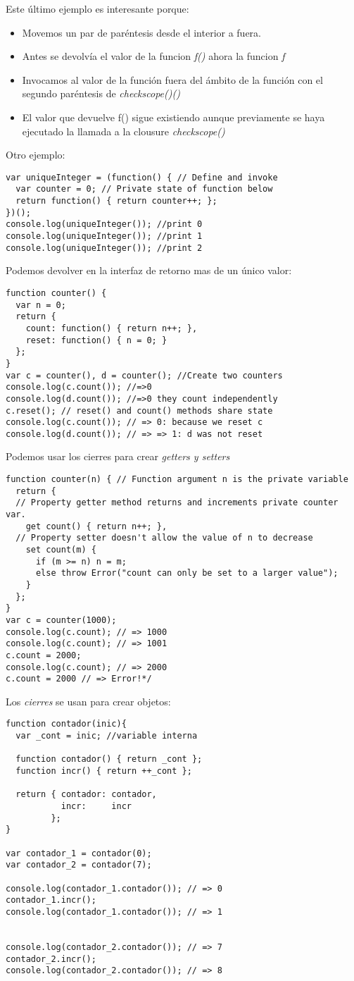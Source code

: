\documentclass[4paper]{article}
\begin{document}
Este último ejemplo es interesante porque:
\begin{itemize}
\item Movemos un par de paréntesis desde el interior a fuera.
\item Antes se devolvía el valor de la funcion \textit{f()} ahora la funcion \textit{f}
\item Invocamos al valor de la función fuera del ámbito de la función con el segundo paréntesis de \emph{checkscope()()}
\item El valor que devuelve f() sigue existiendo aunque previamente se haya ejecutado la llamada a la clousure \emph{checkscope()}
\end{itemize}
Otro ejemplo:
\begin{lstlisting}
var uniqueInteger = (function() { // Define and invoke
  var counter = 0; // Private state of function below
  return function() { return counter++; };
})();
console.log(uniqueInteger()); //print 0
console.log(uniqueInteger()); //print 1
console.log(uniqueInteger()); //print 2
\end{lstlisting}
Podemos devolver en la interfaz de retorno mas de un único valor:
\begin{lstlisting}
function counter() {
  var n = 0;
  return {
    count: function() { return n++; },
    reset: function() { n = 0; }
  };
}
var c = counter(), d = counter(); //Create two counters
console.log(c.count()); //=>0
console.log(d.count()); //=>0 they count independently
c.reset(); // reset() and count() methods share state
console.log(c.count()); // => 0: because we reset c
console.log(d.count()); // => => 1: d was not reset
\end{lstlisting}
\newpage
Podemos usar los cierres para crear \textit{getters y setters}
\begin{lstlisting}
function counter(n) { // Function argument n is the private variable
  return {
  // Property getter method returns and increments private counter var.
    get count() { return n++; },
  // Property setter doesn't allow the value of n to decrease
    set count(m) {
      if (m >= n) n = m;
      else throw Error("count can only be set to a larger value");
    }
  };
}
var c = counter(1000);
console.log(c.count); // => 1000
console.log(c.count); // => 1001
c.count = 2000;
console.log(c.count); // => 2000
c.count = 2000 // => Error!*/
\end{lstlisting}
Los \emph{cierres} se usan para crear objetos:
\begin{lstlisting}
function contador(inic){
  var _cont = inic; //variable interna

  function contador() { return _cont };
  function incr() { return ++_cont };

  return { contador: contador,
           incr:     incr
         };
}

var contador_1 = contador(0);
var contador_2 = contador(7);

console.log(contador_1.contador()); // => 0
contador_1.incr();
console.log(contador_1.contador()); // => 1


console.log(contador_2.contador()); // => 7
contador_2.incr();
console.log(contador_2.contador()); // => 8
\end{lstlisting}
\end{document}
